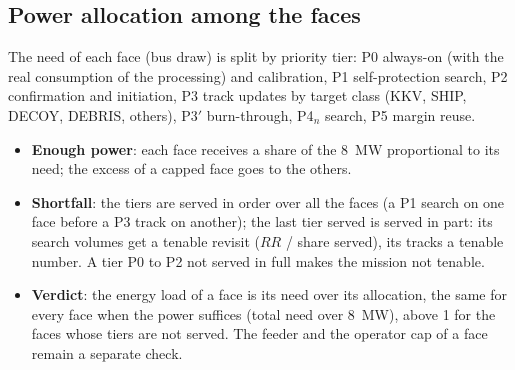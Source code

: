 \documentclass[11pt,a4paper]{article}
\begin{document}
\subsection{Power allocation among the faces}
The need of each face (bus draw) is split by priority tier: P0 always-on (with the real consumption of the
processing) and calibration, P1 self-protection search, P2 confirmation and initiation, P3 track updates by target class
(KKV, SHIP, DECOY, DEBRIS, others), P3$'$ burn-through, P4$_n$ search, P5 margin reuse.
\begin{itemize}
  \item \textbf{Enough power}: each face receives a share of the \SI{8}{MW} proportional to its need; the excess of a
        capped face goes to the others.
  \item \textbf{Shortfall}: the tiers are served in order over all the faces (a P1 search on one face before a P3 track
        on another); the last tier served is served in part: its search volumes get a tenable revisit
        ($RR$ / share served), its tracks a tenable number. A tier P0 to P2 not served in full makes the mission not
        tenable.
  \item \textbf{Verdict}: the energy load of a face is its need over its allocation, the same for every face when the
        power suffices (total need over \SI{8}{MW}), above 1 for the faces whose tiers are not served. The feeder and
        the operator cap of a face remain a separate check.
\end{itemize}
\end{document}
